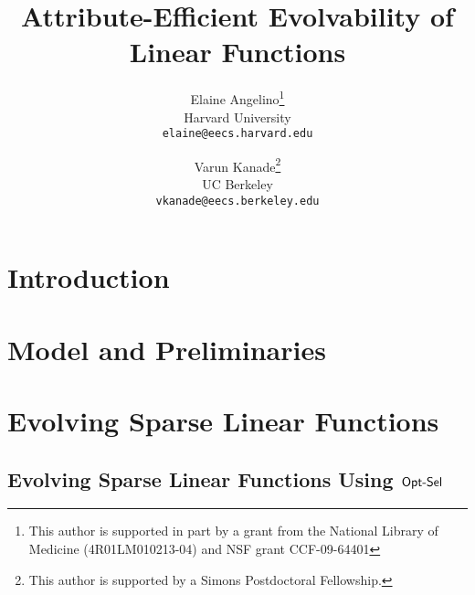 \documentclass[11pt]{article}
\begin{document}
\title{Attribute-Efficient Evolvability of Linear Functions} 
\author{Elaine Angelino\thanks{This author is supported in part by a grant from
the National Library of Medicine (4R01LM010213-04) and NSF grant CCF-09-64401}\\
Harvard University \\ \texttt{elaine@eecs.harvard.edu} \and Varun
Kanade\thanks{This author is supported by a Simons Postdoctoral Fellowship.} \\
UC Berkeley \\ \texttt{vkanade@eecs.berkeley.edu}}

\maketitle

\begin{abstract}

\end{abstract}

\newpage

\section{Introduction}
\label{sec:introduction}


\section{Model and Preliminaries}
\label{sec:notation}


\section{Evolving Sparse Linear Functions}
\label{sec:algorithms}


\subsection{Evolving Sparse Linear Functions Using $\mathsf{Opt\mbox{-}Sel}$}
\label{sec:greedy}


% 
% 
% 
\end{document}
